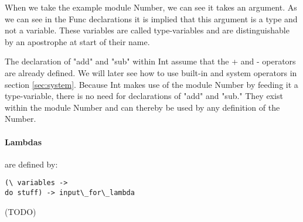 When we take the example module Number, we can see it takes an argument.
As we can see in the Func declarations it is implied that this argument is a type and not a variable.
These variables are called type-variables and are distinguishable by an apostrophe at start of their name.

The declaration of "add" and "sub" within Int assume that the + and - operators are already defined.
We will later see how to use built-in and system operators in section \ref{sec:system}.
Because Int makes use of the module Number by feeding it a type-variable, there is no need for declarations of "add" and "sub."
They exist within the module Number and can thereby be used by any definition of the Number.











\paragraph{Lambdas}
are defined by:

\begin{lstlisting}
(\ variables ->
do stuff) -> input\_for\_lambda
\end{lstlisting}

(TODO)

